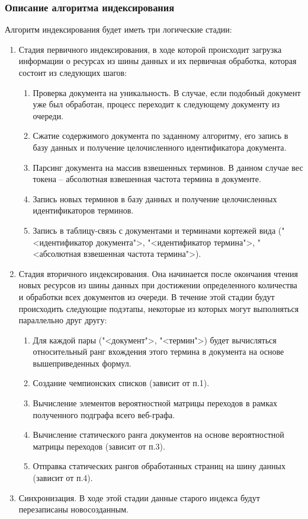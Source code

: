 \subsubsection{Описание алгоритма индексирования}

Алгоритм индексирования будет иметь три логические стадии:
\begin{enumerate}
\item Стадия первичного индексирования, в ходе которой происходит загрузка информации о ресурсах из шины данных и их первичная обработка, которая состоит из следующих шагов:
\begin{enumerate}
\item Проверка документа на уникальность. В случае, если подобный документ уже был обработан, процесс переходит к следующему документу из очереди.
\item Сжатие содержимого документа по заданному алгоритму, его запись в базу данных и получение целочисленного идентификатора документа.
\item Парсинг документа на массив взвешенных терминов. В данном случае вес токена -- абсолютная взвешенная частота термина в документе.
\item Запись новых терминов в базу данных и получение целочисленных идентификаторов терминов.
\item Запись в таблицу-связь с документами и терминами кортежей вида ("<идентификатор документа">, "<идентификатор термина">, "<абсолютная взвешенная частота термина">).
\end{enumerate}
\item Стадия вторичного индексирования. Она начинается после окончания чтения новых ресурсов из шины данных при достижении определенного количества и обработки всех документов из очереди. В течение этой стадии будут происходить следующие подэтапы, некоторые из которых могут выполняться параллельно друг другу:
\begin{enumerate}
\item Для каждой пары ("<документ">, "<термин">) будет вычисляться относительный ранг вхождения этого термина в документа на основе вышеприведенных формул.
\item Создание чемпионских списков (зависит от п.1).
\item Вычисление элементов вероятностной матрицы переходов в рамках полученного подграфа всего веб-графа.
\item Вычисление статического ранга документов на основе вероятностной матрицы переходов (зависит от п.3).
\item Отправка статических рангов обработанных страниц на шину данных (зависит от п.4).
\end{enumerate}
\item Синхронизация. В ходе этой стадии данные старого индекса будут перезаписаны новосозданным.
\end{enumerate}

